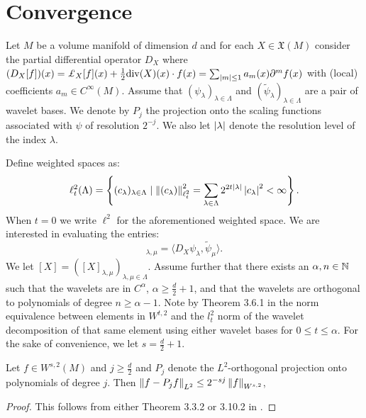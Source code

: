 \section{Convergence}

Let $M$ be a volume manifold of dimension $d$ and for each $X \in \mathfrak{X}(M)$ consider the partial differential operator $D_X$ where $(D_X [f] )(x) = \pounds_X[f] (x)+ \frac{1}{2} \mathrm{div}(X)(x) \cdot f(x) = \sum_{\abs{m}\leq 1} a_m(x) \partial^m f(x)$ with (local) coefficients $a_m \in C^{\infty}(M)$. Assume that $(\psi_\lambda)_{\lambda \in \Lambda}$ and $(\tilde{\psi}_\lambda)_{\lambda \in \Lambda}$ are a pair of wavelet bases. We denote by $P_j$ the projection onto the scaling functions associated with $\psi$ of resolution $2^{-j}$. We also let ${\lvert\lambda\rvert}$ denote the resolution level of the index $\lambda$. 

Define weighted spaces as:
\begin{equation}
	\ell_t^2(\Lambda) = \left\{ (c_\lambda)_{\lambda \in \Lambda}  \mid \left\| (c_\lambda) \right\|_{\ell^2_t}^2 = \sum_{\lambda \in \Lambda} 2^{2t{\lvert\lambda\rvert}}\left| c_\lambda \right|^2 < \infty  \right\}.
\end{equation}
When $t = 0$ we write $\ell^2$ for the aforementioned weighted space. We are interested in evaluating the entries:
\begin{equation}
	[X]_{\lambda,\mu} = \langle D_X \psi_\lambda, \tilde{\psi}_\mu \rangle.
\end{equation}
We let $[X]=([X]_{\lambda,\mu})_{\lambda,\mu \in \Lambda}$. Assume further that there exists an $\alpha,n \in \mathbb{N}$ such that the wavelets are in $C^{\alpha}$, $\alpha \geq \frac{d}{2} + 1$, and that the wavelets are orthogonal to polynomials of degree $n \geq \alpha - 1$.  Note by Theorem 3.6.1 in \cite{Cohen2003} the norm equivalence between elements in $W^{t,2}$ and the $l_t^2$ norm of the wavelet decomposition of that same element using either wavelet bases for $0\leq t \leq \alpha$. For the sake of convenience, we let $s = \frac{d}{2} + 1$. 

\begin{lemma} \label{lem:projection_bound}
	Let $f \in W^{s,2}(M)$ and $j \geq \frac{d}{2}$ and $P_j$ denote the $L^2$-orthogonal projection onto polynomials of degree $j$.
	Then $\left\| f - P_j f \right\|_{L^2} \leq  2^{-sj}\left\| f \right\|_{W^{s,2}}$,
\end{lemma}
\begin{proof}
	This follows from either Theorem 3.3.2 or 3.10.2 in \cite{Cohen2003}.
\end{proof}

